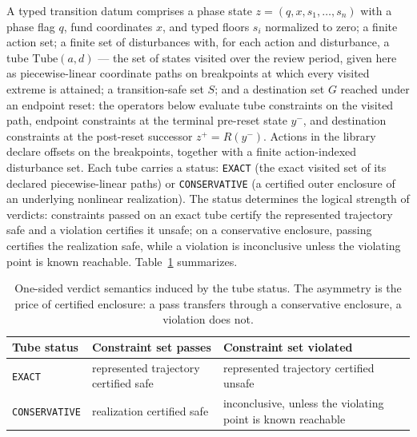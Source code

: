 \documentclass[3p,11pt]{elsarticle}
\begin{document}
A typed transition datum comprises a phase state
$z = (q, x, s_1, \dots, s_n)$ with a phase flag $q$, fund coordinates $x$,
and typed floors $s_i$ normalized to zero; a finite action set; a finite set of disturbances with, for each action
and disturbance, a tube $\mathrm{Tube}(a, d)$ --- the set of states
visited over the review period, given here as piecewise-linear coordinate
paths on breakpoints at which every visited extreme is attained; a
transition-safe set $S$; and a destination set $G$ reached under an
endpoint reset: the operators below evaluate tube constraints on the
visited path, endpoint constraints at the terminal pre-reset state
$y^{-}$, and destination constraints at the post-reset successor
$z^{+} = R(y^{-})$. Actions in the library declare offsets on the
breakpoints, together with a finite action-indexed disturbance set. Each
tube carries a status: \texttt{EXACT} (the exact visited set of its
declared piecewise-linear paths) or \texttt{CONSERVATIVE} (a certified
outer enclosure of an underlying nonlinear realization). The status
determines the logical strength of verdicts: constraints passed on an
exact tube certify the represented trajectory safe and a violation
certifies it unsafe; on a conservative enclosure, passing certifies the
realization safe, while a violation is inconclusive unless the violating
point is known reachable. Table~\ref{tab:verdicts} summarizes.

\begin{table}[t]
\centering\small
\begin{tabular}{@{}lll@{}}
\toprule
Tube status & Constraint set passes & Constraint set violated \\
\midrule
\texttt{EXACT} & represented trajectory certified safe & represented
trajectory certified unsafe \\
\texttt{CONSERVATIVE} & realization certified safe & inconclusive,
unless the violating point is known reachable \\
\bottomrule
\end{tabular}
\caption{One-sided verdict semantics induced by the tube status. The
asymmetry is the price of certified enclosure: a pass transfers through
a conservative enclosure, a violation does not.}
\label{tab:verdicts}
\end{table}
\end{document}
